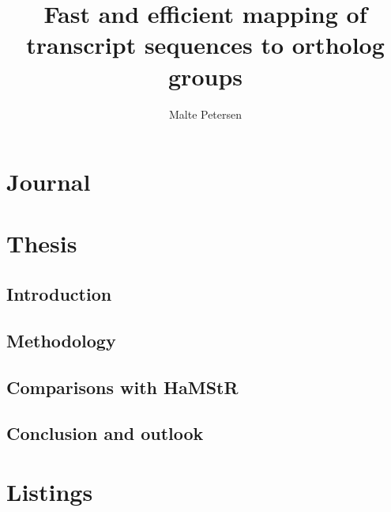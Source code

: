 \documentclass[a4paper]{scrreprt}
\title{Fast and efficient mapping of transcript sequences to ortholog groups}
\author{Malte Petersen}
\newcommand{\hamstr}{HaMStR\xspace}
\begin{document}
\maketitle
\tableofcontents

\chapter{Journal}




\chapter{Thesis}

\section{Introduction}


%
\clearpage

\section{Methodology}

\clearpage

\section{Comparisons with \hamstr}
\clearpage

\section{Conclusion and outlook}
\clearpage




\appendix

\chapter{Listings}



\end{document}
